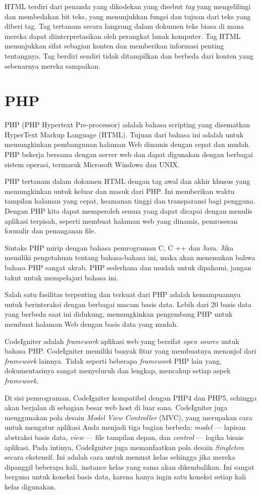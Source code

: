 \documentclass[a4paper,twoside]{article}
\begin{document}
\begin{enumerate}
HTML terdiri dari penanda yang dikodekan yang disebut \textit{tag} yang mengelilingi dan membedakan bit teks, yang menunjukkan fungsi dan tujuan dari teks yang diberi tag. Tag tertanam secara langsung dalam dokumen teks biasa di mana mereka dapat diinterpretasikan oleh perangkat lunak komputer. Tag HTML menunjukkan sifat sebagian konten dan memberikan informasi penting tentangnya. Tag berdiri sendiri tidak ditampilkan dan berbeda dari konten yang sebenarnya mereka sampaikan.

\section*{PHP}
PHP (PHP Hypertext Pre-processor) adalah bahasa scripting yang disematkan HyperText Markup Language (HTML). Tujuan dari bahasa ini adalah untuk memungkinkan pembangunan halaman Web dinamis dengan cepat dan mudah. PHP bekerja bersama dengan server web dan dapat digunakan dengan berbagai sistem operasi, termasuk Microsoft Windows dan UNIX.

PHP tertanam dalam dokumen HTML dengan tag awal dan akhir khusus yang memungkinkan untuk keluar dan masuk dari PHP. Ini memberikan waktu tampilan halaman yang cepat, keamanan tinggi dan transparansi bagi pengguna. Dengan PHP kita dapat memperoleh semua yang dapat dicapai dengan menulis aplikasi terpisah, seperti membuat halaman web yang dinamis, pemrosesan formulir dan penanganan file.

Sintaks PHP mirip dengan bahasa pemrograman C, C ++ dan Java. Jika  memiliki pengetahuan tentang bahasa-bahasa ini, maka akan menemukan bahwa bahasa PHP sangat akrab. PHP sederhana dan mudah untuk dipahami, jangan takut untuk mempelajari bahasa ini.

Salah satu fasilitas terpenting dan terkuat dari PHP adalah kemampuannya untuk berinteraksi dengan berbagai macam basis data. Lebih dari 20 basis data yang berbeda saat ini didukung, memungkinkan pengembang PHP untuk membuat halaman Web dengan basis data yang mudah. 

CodeIgniter adalah \textit{framework} aplikasi web yang bersifat \textit{open source} untuk bahasa PHP. CodeIgniter memiliki banyak fitur yang membuatnya menonjol dari \textit{framework} lainnya. Tidak seperti beberapa \textit{framework} PHP lain yang, dokumentasinya sangat menyeluruh dan lengkap, mencakup setiap aspek \textit{framework}. 

Di sisi pemrograman, CodeIgniter kompatibel dengan PHP4 dan PHP5, sehingga akan berjalan di sebagian besar web host di luar sana. CodeIgniter juga menggunakan pola desain \textit{Model View Controller} (MVC), yang merupakan cara untuk mengatur aplikasi Anda menjadi tiga bagian berbeda: \textit{model} — lapisan abstraksi basis data, \textit{view} — file tampilan depan, dan \textit{control} — logika bisnis aplikasi. Pada intinya, CodeIgniter juga memanfaatkan pola desain \textit{Singleton} secara ekstensif. Ini adalah cara untuk memuat kelas sehingga jika mereka dipanggil beberapa kali, instance kelas yang sama akan dikembalikan. Ini sangat berguna untuk koneksi basis data, karena hanya ingin satu koneksi setiap kali kelas digunakan.



\end{enumerate}
\end{document}
